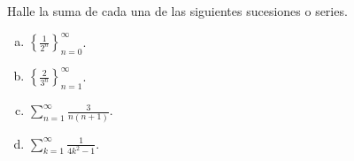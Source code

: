 \begin{enunciado}
 Halle la suma de cada una de las siguientes sucesiones o series.
 \begin{multicols}{2}
  \begin{enumerate}[(a)]
   \item $\displaystyle{ \left\{ \frac{1}{2^n} \right\}_{n=0}^{\infty} }$.
   \item $\displaystyle{ \left\{ \frac{2}{3^n} \right\}_{n=1}^{\infty} }$.
  \end{enumerate}
 \end{multicols}
 \begin{multicols}{2}
  \begin{enumerate}[(a)]
   \setcounter{enumii}{2}
   \item $\displaystyle{ \sum_{n=1}^{\infty} \frac{3}{n(n+1)} }$.
   \item $\displaystyle{ \sum_{k=1}^{\infty} \frac{1}{4k^2 - 1} }$.
  \end{enumerate}
 \end{multicols}
\end{enunciado}


